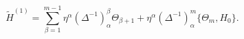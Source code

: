 \begin{equation}
 \tilde{H}^{(1)}=\sum_{\beta=1}^{m-1} \eta^\alpha (\Delta^{-1})_\alpha ^\beta
 \Theta_{\beta+1} + \eta^\alpha(\Delta^{-1})_\alpha ^m \{\Theta_m , H_0\}.
 \label{g3}
 \end{equation}

